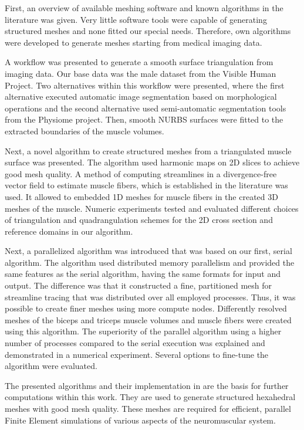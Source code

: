 First, an overview of available meshing software and known algorithms in the literature was given. Very little software tools were capable of generating structured meshes and none fitted our special needs. Therefore, own algorithms were developed to generate meshes starting from medical imaging data.

A workflow was presented to generate a smooth surface triangulation from imaging data. Our base data was the male dataset from the Visible Human Project. Two alternatives within this workflow were presented, where the first alternative executed automatic image segmentation based on morphological operations and the second alternative used semi-automatic segmentation tools from the Physiome project. Then, smooth NURBS surfaces were fitted to the extracted boundaries of the muscle volumes.

Next, a novel algorithm to create structured meshes from a triangulated muscle surface was presented. The algorithm used harmonic maps on 2D slices to achieve good mesh quality. A method of computing streamlines in a divergence-free vector field to estimate muscle fibers, which is established in the literature was used. It allowed to embedded 1D meshes for muscle fibers in the created 3D meshes of the muscle. Numeric experiments tested and evaluated different choices of triangulation and quadrangulation schemes for the 2D cross section and reference domains in our algorithm.

Next, a parallelized algorithm was introduced that was based on our first, serial algorithm. The algorithm used distributed memory parallelism and provided the same features as the serial algorithm, having the same formats for input and output. The difference was that it constructed a fine, partitioned mesh for streamline tracing that was distributed over all employed processes. Thus, it was possible to create finer meshes using more compute nodes. Differently resolved meshes of the biceps and triceps muscle volumes and muscle fibers were created using this algorithm. The superiority of the parallel algorithm using a higher number of processes compared to the serial execution was explained and demonstrated in a numerical experiment. Several options to fine-tune the algorithm were evaluated.

The presented algorithms and their implementation in \opendihu{} are the basis for further computations within this work. They are used to generate structured hexahedral meshes with good mesh quality. These meshes are required for efficient, parallel Finite Element simulations of various aspects of the neuromuscular system.

